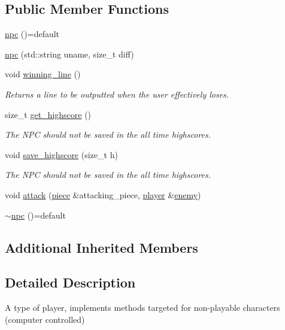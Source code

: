 \subsection*{Public Member Functions}
\begin{DoxyCompactItemize}
\item 
\hyperlink{classbattle__ship_1_1npc_ab92a83aba6dbf1060ebdb666087790b8}{npc} ()=default
\item 
\hyperlink{classbattle__ship_1_1npc_a6a5c77aa108694177865edb9c2d06947}{npc} (std\+::string uname, size\+\_\+t diff)
\item 
void \hyperlink{classbattle__ship_1_1npc_a10c65edd38e75ac6be91ecd2dc9c9866}{winning\+\_\+line} ()
\begin{DoxyCompactList}\small\item\em Returns a line to be outputted when the user effectively loses. \end{DoxyCompactList}\item 
size\+\_\+t \hyperlink{classbattle__ship_1_1npc_acb3ad1c27c948ae968697c795f10a6b9}{get\+\_\+highscore} ()
\begin{DoxyCompactList}\small\item\em The N\+PC should not be saved in the all time highscores. \end{DoxyCompactList}\item 
void \hyperlink{classbattle__ship_1_1npc_ab81843d30e5f8801a8fe479d44ead157}{save\+\_\+highscore} (size\+\_\+t h)
\begin{DoxyCompactList}\small\item\em The N\+PC should not be saved in the all time highscores. \end{DoxyCompactList}\item 
void \hyperlink{classbattle__ship_1_1npc_abe6ec844c73c5410c2c4887fd50fac06}{attack} (\hyperlink{classbattle__ship_1_1piece}{piece} \&attacking\+\_\+piece, \hyperlink{classbattle__ship_1_1player}{player} \&\hyperlink{classbattle__ship_1_1player_af01292346caaf209039b6490ae18d8aa}{enemy})
\item 
\hyperlink{classbattle__ship_1_1npc_ab548776b810769c0af009f1db0df4ede}{$\sim$npc} ()=default
\end{DoxyCompactItemize}
\subsection*{Additional Inherited Members}


\subsection{Detailed Description}
A type of player, implements methods targeted for non-\/playable characters (computer controlled) 


